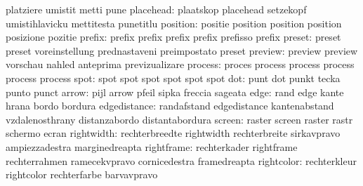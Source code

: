                            platziere                 umistit
                           metti                     pune %
                placehead: plaatskop                 placehead
                           setzekopf                 umistihlavicku
                           mettitesta                punetitlu %
                 position: positie                   position
                           position                  position
                           posizione                 pozitie %
                   prefix: prefix                    prefix
                           prefix                    prefix
                           prefisso                  prefix
                   preset: preset                    preset
                           voreinstellung            prednastaveni
                           preimpostato              preset %
                  preview: preview                   preview
                           vorschau                  nahled
                           anteprima                 previzualizare
process: proces   process
         process  process
         process  process
   spot: spot spot
         spot spot
         spot spot
                      dot: punt                      dot
                           punkt                     tecka
                           punto                     punct
                    arrow: pijl                      arrow
                           pfeil                     sipka
                           freccia                   sageata
                     edge: rand                      edge
                           kante                     hrana
                           bordo                     bordura
             edgedistance: randafstand               edgedistance
                           kantenabstand             vzdalenosthrany
                           distanzabordo             distantabordura
                   screen: raster                    screen
                           raster                    rastr
                           schermo                   ecran
               rightwidth: rechterbreedte            rightwidth
                           rechterbreite             sirkavpravo
                           ampiezzadestra            marginedreapta
               rightframe: rechterkader              rightframe
                           rechterrahmen             ramecekvpravo
                           cornicedestra             framedreapta
               rightcolor: rechterkleur              rightcolor
                           rechterfarbe              barvavpravo
